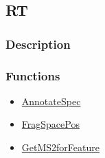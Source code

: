 \subsection{RT}\label{RT}
\subsubsection{Description}


\subsubsection{Functions}
\begin{itemize}
\item \hyperref[AnnotateSpec]{AnnotateSpec}
\item \hyperref[FragSpacePos]{FragSpacePos}
\item \hyperref[GetMS2forFeature]{GetMS2forFeature}
\end{itemize}


